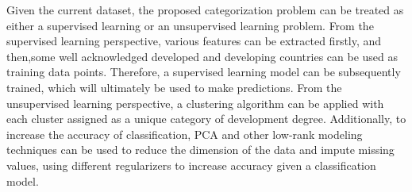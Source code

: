 \documentclass[a4paper]{article}
\begin{document}
Given the current dataset, the proposed categorization problem can be treated as either a supervised learning or an unsupervised learning problem. From the supervised learning perspective, various features can be extracted firstly, and then,some well acknowledged developed and developing countries can be used as training data points. Therefore, a supervised learning model can be subsequently trained, which will ultimately be used to make predictions. From the unsupervised learning perspective, a clustering algorithm can be applied with each cluster assigned as a unique category of development degree. Additionally, to increase the accuracy of classification, PCA and other low-rank modeling techniques can be used to reduce the dimension of the data and impute missing values, using different regularizers to increase accuracy given a classification model.
\end{document}
